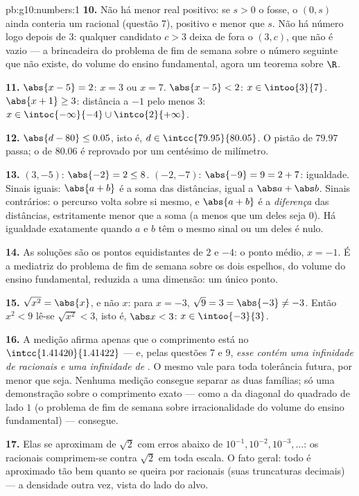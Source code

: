 \begin{solution}{pb:g10:numbers:1}
\textbf{10.} Não há menor real positivo: se $s > 0$ o fosse, o
 $(0, s)$ ainda conteria um racional (questão 7),
positivo e menor que $s$. Não há número logo depois de $3$:
qualquer candidato $c > 3$ deixa de fora o  $(3, c)$,
que não é vazio --- a brincadeira do problema de fim de semana
sobre o número seguinte que não existe, do volume do ensino
fundamental, agora um teorema sobre $\R$.

\textbf{11.} $\abs{x - 5} = 2$: $x = 3$ ou $x = 7$.
$\abs{x - 5} < 2$: $x \in \intoo{3}{7}$.
$\abs{x + 1} \geq 3$: distância a $-1$ pelo menos $3$:
$x \in \intoc{-\infty}{-4} \cup \intco{2}{+\infty}$.

\textbf{12.} $\abs{d - 80} \leq 0.05$, isto é,
$d \in \intcc{79.95}{80.05}$. O pistão de $79.97$ passa; o de
$80.06$ é reprovado por um centésimo de milímetro.

\textbf{13.} $(3, -5)$: $\abs{-2} = 2 \leq 8$. $(-2, -7)$:
$\abs{-9} = 9 = 2 + 7$: igualdade. Sinais iguais: $\abs{a + b}$
é a soma das distâncias, igual a $\abs a + \abs b$. Sinais
contrários: o percurso volta sobre si mesmo, e $\abs{a + b}$ é
a \emph{diferença} das distâncias, estritamente menor que a
soma (a menos que um deles seja $0$). Há igualdade exatamente
quando $a$ e $b$ têm o mesmo sinal ou um deles é nulo.

\textbf{14.} As soluções são os pontos equidistantes de $2$ e
$-4$: o ponto médio, $x = -1$. É a mediatriz do problema de fim
de semana sobre os dois espelhos, do volume do ensino
fundamental, reduzida a uma dimensão: um único ponto.

\textbf{15.} $\sqrt{x^2} = \abs{x}$, e não $x$: para $x = -3$,
$\sqrt{9} = 3 = \abs{-3} \neq -3$. Então $x^2 < 9$ lê-se
$\sqrt{x^2} < 3$, isto é, $\abs x < 3$:
$x \in \intoo{-3}{3}$.

\textbf{16.} A medição afirma apenas que o comprimento está no
 $\intcc{1.41420}{1.41422}$ --- e, pelas questões 7 e
9, \emph{esse  contém uma infinidade de racionais e
uma infinidade de }. O mesmo vale para toda
tolerância futura, por menor que seja. Nenhuma medição consegue
separar as duas famílias; só uma demonstração sobre o
comprimento exato --- como a da diagonal do quadrado de lado
$1$ (o problema de fim de semana sobre irracionalidade do
volume do ensino fundamental) --- consegue.

\textbf{17.} Elas se aproximam de $\sqrt2$ com erros abaixo de
$10^{-1}, 10^{-2}, 10^{-3}, \dots$: os racionais comprimem-se
contra $\sqrt2$ em toda escala. O fato geral: todo 
é aproximado tão bem quanto se queira por racionais (suas
truncaturas decimais) --- a densidade outra vez, vista do lado
do alvo.


\end{solution}
